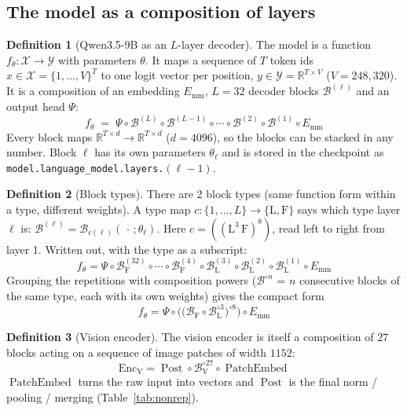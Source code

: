 \documentclass[10pt,a4paper]{article}
\newcommand{\op}[1]{\operatorname{#1}}
\theoremstyle{definition}
\newtheorem{definition}{Definition}[section]
\begin{document}
\subsection{The model as a composition of layers}\label{sec:comp}
\begin{definition}[Qwen3.5-9B as an $L$-layer decoder]
The model is a function $f_\theta:\mathcal{X}\to\mathcal{Y}$ with parameters $\theta$. It maps a sequence of $T$ token ids $x\in\mathcal{X}=\{1,\dots,V\}^{T}$ to one logit vector per position, $y\in\mathcal{Y}=\mathbb{R}^{T\times V}$ ($V=248{,}320$). It is a composition of an embedding $E_{\mathrm{mm}}$, $L=32$ decoder blocks $\mathcal{B}^{(\ell)}$ and an output head $\Psi$:
\begin{equation}
  f_\theta \;=\; \Psi\circ\mathcal{B}^{(L)}\circ\mathcal{B}^{(L-1)}\circ\cdots\circ\mathcal{B}^{(2)}\circ\mathcal{B}^{(1)}\circ E_{\mathrm{mm}}
\end{equation}
Every block maps $\mathbb{R}^{T\times d}\to\mathbb{R}^{T\times d}$ ($d=4096$), so the blocks can be stacked in any number. Block $\ell$ has its own parameters $\theta_\ell$ and is stored in the checkpoint as \texttt{model.language\_model.layers.}$(\ell-1)$.
\end{definition}
\begin{definition}[Block types]
There are 2 block types (same function form within a type, different weights). A type map $c:\{1,\dots,L\}\to\{\mathrm{L},\mathrm{F}\}$ says which type layer $\ell$ is: $\mathcal{B}^{(\ell)}=\mathcal{B}_{c(\ell)}(\,\cdot\,;\theta_\ell)$. Here $c=((\mathrm{L}^{3}\,\mathrm{F})^{8})$, read left to right from layer 1.
Written out, with the type as a subscript:
\begin{equation}
  f_\theta = \Psi\circ \mathcal{B}^{(32)}_{\mathrm{F}}\circ \cdots\circ \mathcal{B}^{(4)}_{\mathrm{F}}\circ \mathcal{B}^{(3)}_{\mathrm{L}}\circ \mathcal{B}^{(2)}_{\mathrm{L}}\circ \mathcal{B}^{(1)}_{\mathrm{L}}\circ E_{\mathrm{mm}}
\end{equation}
Grouping the repetitions with composition powers ($\mathcal{B}^{\circ n}$ = $n$ consecutive blocks of the same type, each with its own weights) gives the compact form
\begin{equation}\label{eq:compact}
  f_\theta = \Psi\circ\Big(\big(\mathcal{B}_{\mathrm{F}} \circ \mathcal{B}_{\mathrm{L}}^{\circ 3}\big)^{\circ 8}\Big)\circ E_{\mathrm{mm}}
\end{equation}
\end{definition}
\begin{definition}[Vision encoder]
The vision encoder is itself a composition of $27$ blocks acting on a sequence of image patches of width $1152$:
\begin{equation}
  \op{Enc_V} = \op{Post}\circ \mathcal{B}_{\mathrm{V}}^{\circ 27}\circ\op{PatchEmbed}
\end{equation}
$\op{PatchEmbed}$ turns the raw input into vectors and $\op{Post}$ is the final norm / pooling / merging (Table~\ref{tab:nonrep}).
\end{definition}
\end{document}
